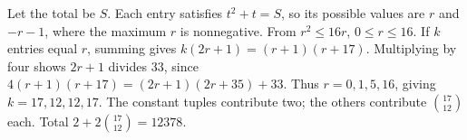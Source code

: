 Let the total be $S$. Each entry satisfies $t^2+t=S$, so its possible values are $r$ and $-r-1$, where the maximum $r$ is nonnegative. From $r^2\le16r$, $0\le r\le16$. If $k$ entries equal $r$, summing gives $k(2r+1)=(r+1)(r+17)$. Multiplying by four shows $2r+1$ divides 33, since $4(r+1)(r+17)=(2r+1)(2r+35)+33$. Thus $r=0,1,5,16$, giving $k=17,12,12,17$. The constant tuples contribute two; the others contribute $\binom{17}{12}$ each. Total $\boxed{2+2\binom{17}{12}=12378}$.
